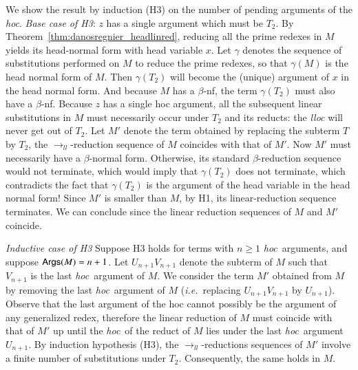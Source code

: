 \documentclass{elsarticle}
\makeatletter
\theoremstyle{plain}
\theoremstyle{definition}
\renewcommand\ie{{\it i.e.\@\xspace}}
\newcommand{\llred}{\rightarrow_{ll}}
\newcommand{\hoc}{\emph{hoc}}
\makeatother
\begin{document}
    We show the result by induction (H3) on the number of pending arguments of the \emph{hoc}.
    \emph{Base case of H3}: $z$ has a single argument which must be $T_2$.
    By Theorem~\ref{thm:danosregnier_headlinred}, reducing all the prime redexes in $M$ yields its head-normal form
    with head variable $x$.
    Let $\gamma$ denotes the sequence of substitutions performed on $M$ to reduce the prime redexes, so that $\gamma(M)$ is the head normal form of $M$.  Then $\gamma(T_2)$ will become the (unique) argument of $x$ in the head normal form. And because $M$ has a $\beta$-nf, the term $\gamma(T_2)$ must also have a $\beta$-nf.
    Because $z$ has a single hoc argument, all the subsequent linear substitutions in $M$ must necessarily occur under $T_2$ and its reducts: the \emph{lloc} will never get out of $T_2$.
    Let $M'$ denote the term obtained by replacing
    the subterm $T$ by $T_2$, the $\llred$-reduction sequence of $M$ coincides with that of $M'$.
    Now $M'$ must necessarily have a $\beta$-normal form. Otherwise, its standard $\beta$-reduction sequence would not terminate, which would imply that $\gamma(T_2)$ does not terminate, which contradicts the fact that $\gamma(T_2)$ is the argument of the head variable in the head normal form!
    Since $M'$ is smaller than $M$, by H1, its linear-reduction sequence terminates. We can conclude since the linear reduction sequences of $M$ and $M'$ coincide.

     \emph{Inductive case of H3} Suppose H3  holds for terms with $n \geq 1$ \hoc\ arguments, and suppose ${\sf Args}(M) = n+1$.
    Let $U_{n+1} V_{n+1}$ denote the subterm of $M$ such that $V_{n+1}$ is the last \hoc\ argument of $M$. We consider the term $M'$ obtained from $M$ by removing the last \hoc\ argument of $M$ (\ie~replacing $U_{n+1} V_{n+1}$ by $U_{n+1}$).
    Observe that the last argument of the hoc cannot possibly be the argument of any generalized redex, therefore the linear reduction of $M$ must  coincide with that of $M'$ up until the \hoc\ of the reduct of $M$ lies under the last \hoc\ argument $U_{n+1}$.
%
    By induction hypothesis (H3), the $\llred$-reductions sequences of $M'$ involve a finite number of substitutions under $T_2$. Consequently, the same holds in $M$.
\end{document}
